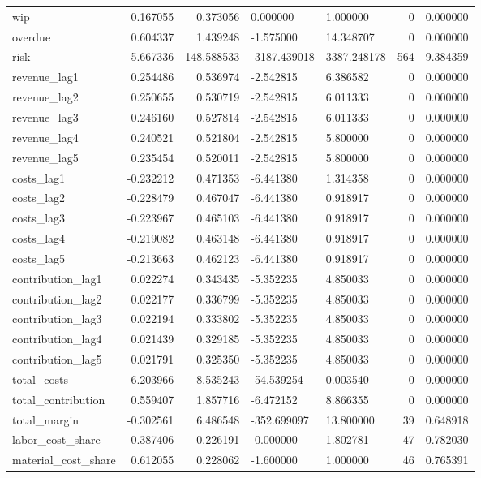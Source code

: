 \begin{landscape}
\begin{longtable}[h!]{lrrllrr}
wip & 0.167055 & 0.373056 & 0.000000 & 1.000000 & 0 & 0.000000 \\
overdue & 0.604337 & 1.439248 & -1.575000 & 14.348707 & 0 & 0.000000 \\
risk & -5.667336 & 148.588533 & -3187.439018 & 3387.248178 & 564 & 9.384359 \\
revenue_lag1 & 0.254486 & 0.536974 & -2.542815 & 6.386582 & 0 & 0.000000 \\
revenue_lag2 & 0.250655 & 0.530719 & -2.542815 & 6.011333 & 0 & 0.000000 \\
revenue_lag3 & 0.246160 & 0.527814 & -2.542815 & 6.011333 & 0 & 0.000000 \\
revenue_lag4 & 0.240521 & 0.521804 & -2.542815 & 5.800000 & 0 & 0.000000 \\
revenue_lag5 & 0.235454 & 0.520011 & -2.542815 & 5.800000 & 0 & 0.000000 \\
costs_lag1 & -0.232212 & 0.471353 & -6.441380 & 1.314358 & 0 & 0.000000 \\
costs_lag2 & -0.228479 & 0.467047 & -6.441380 & 0.918917 & 0 & 0.000000 \\
costs_lag3 & -0.223967 & 0.465103 & -6.441380 & 0.918917 & 0 & 0.000000 \\
costs_lag4 & -0.219082 & 0.463148 & -6.441380 & 0.918917 & 0 & 0.000000 \\
costs_lag5 & -0.213663 & 0.462123 & -6.441380 & 0.918917 & 0 & 0.000000 \\
contribution_lag1 & 0.022274 & 0.343435 & -5.352235 & 4.850033 & 0 & 0.000000 \\
contribution_lag2 & 0.022177 & 0.336799 & -5.352235 & 4.850033 & 0 & 0.000000 \\
contribution_lag3 & 0.022194 & 0.333802 & -5.352235 & 4.850033 & 0 & 0.000000 \\
contribution_lag4 & 0.021439 & 0.329185 & -5.352235 & 4.850033 & 0 & 0.000000 \\
contribution_lag5 & 0.021791 & 0.325350 & -5.352235 & 4.850033 & 0 & 0.000000 \\
total_costs & -6.203966 & 8.535243 & -54.539254 & 0.003540 & 0 & 0.000000 \\
total_contribution & 0.559407 & 1.857716 & -6.472152 & 8.866355 & 0 & 0.000000 \\
total_margin & -0.302561 & 6.486548 & -352.699097 & 13.800000 & 39 & 0.648918 \\
labor_cost_share & 0.387406 & 0.226191 & -0.000000 & 1.802781 & 47 & 0.782030 \\
material_cost_share & 0.612055 & 0.228062 & -1.600000 & 1.000000 & 46 & 0.765391 \\

\end{longtable}
\end{landscape}
